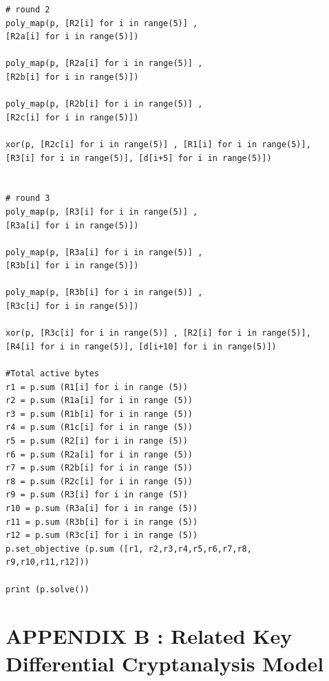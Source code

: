 \begin{lstlisting}[caption={ITUbee SageMath Differential Cryptanalysis MILP model }, label={lst:milp-dif}]
# round 2 
poly_map(p, [R2[i] for i in range(5)] , 
[R2a[i] for i in range(5)])

poly_map(p, [R2a[i] for i in range(5)] , 
[R2b[i] for i in range(5)])

poly_map(p, [R2b[i] for i in range(5)] , 
[R2c[i] for i in range(5)])

xor(p, [R2c[i] for i in range(5)] , [R1[i] for i in range(5)], 
[R3[i] for i in range(5)], [d[i+5] for i in range(5)])


# round 3 
poly_map(p, [R3[i] for i in range(5)] , 
[R3a[i] for i in range(5)])

poly_map(p, [R3a[i] for i in range(5)] , 
[R3b[i] for i in range(5)])

poly_map(p, [R3b[i] for i in range(5)] , 
[R3c[i] for i in range(5)])

xor(p, [R3c[i] for i in range(5)] , [R2[i] for i in range(5)], 
[R4[i] for i in range(5)], [d[i+10] for i in range(5)])

#Total active bytes
r1 = p.sum (R1[i] for i in range (5)) 
r2 = p.sum (R1a[i] for i in range (5)) 
r3 = p.sum (R1b[i] for i in range (5))
r4 = p.sum (R1c[i] for i in range (5))
r5 = p.sum (R2[i] for i in range (5))
r6 = p.sum (R2a[i] for i in range (5))
r7 = p.sum (R2b[i] for i in range (5))
r8 = p.sum (R2c[i] for i in range (5))
r9 = p.sum (R3[i] for i in range (5))
r10 = p.sum (R3a[i] for i in range (5))
r11 = p.sum (R3b[i] for i in range (5))
r12 = p.sum (R3c[i] for i in range (5))
p.set_objective (p.sum ([r1, r2,r3,r4,r5,r6,r7,r8,
r9,r10,r11,r12]))

print (p.solve())

\end{lstlisting}

\newpage

\chapter{{APPENDIX B : }{\normalfont Related Key Differential Cryptanalysis Model}}

